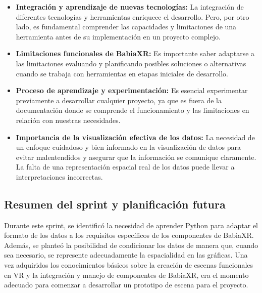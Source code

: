 \documentclass[a4paper, 12pt]{book}
\begin{document}
            \begin{itemize}
                \item \textbf{Integración y aprendizaje de nuevas tecnologías:} La integración de diferentes tecnologías y herramientas enriquece el desarrollo. Pero, por otro lado, es fundamental comprender las capacidades y limitaciones de una herramienta antes de su implementación en un proyecto complejo.
                
                \item \textbf{Limitaciones funcionales de BabiaXR:} Es importante saber adaptarse a las limitaciones evaluando y planificando posibles soluciones o alternativas cuando se trabaja con herramientas en etapas iniciales de desarrollo.
                
                
                \item \textbf{Proceso de aprendizaje y experimentación:} Es esencial experimentar previamente a desarrollar cualquier proyecto, ya que es fuera de la documentación donde se comprende el funcionamiento y las limitaciones en relación con nuestras necesidades.
                
                \item \textbf{Importancia de la visualización efectiva de los datos:} La necesidad de un enfoque cuidadoso y bien informado en la visualización de datos para evitar malentendidos y asegurar que la información se comunique claramente. La falta de una representación espacial real de los datos puede llevar a interpretaciones incorrectas.
                
            \end{itemize}

\subsection{Resumen del sprint y planificación futura}    

Durante este sprint, se identificó la necesidad de aprender Python para adaptar el formato de los datos a los requisitos específicos de los componentes de BabiaXR. Además, se planteó la posibilidad de condicionar los datos de manera que, cuando sea necesario, se represente adecuadamente la espacialidad en las gráficas. Una vez adquiridos los conocimientos básicos sobre la creación de escenas funcionales en VR y la integración y manejo de componentes de BabiaXR, era el momento adecuado para comenzar a desarrollar un prototipo de escena para el proyecto.
\end{document}
